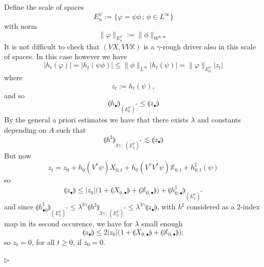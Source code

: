 \documentclass[11pt,a4paper]{amsart}
\numberwithin{equation}{section} %
\newenvironment{Dem}{%
    \begin{list}{\hspace{0.5cm}{\sc Proof --}}{%
        \setlength{\topsep}{0pt}%
        \setlength{\leftmargin}{0pt}%
        \setlength{\rightmargin}{0pt}%
        \setlength{\listparindent}{0pt}%
        \setlength{\itemindent}{0pt}%
        \setlength{\parsep}{0pt}%
        \addtolength{\leftmargin}{20pt}%
        \addtolength{\rightmargin}{0pt}%
    } \item }{\hfill{\space $\rhd$}\end{list}\smallskip}
\begin{document}
\begin{Dem}
Define the scale of spaces 
$$
E_n^\psi := \big\{\varphi = \psi \phi\,;\,\phi \in L^\infty\big\} 
$$
with norm 
$$
\|\varphi\|_{E_n^\psi} := \|\phi\|_{W^{n,\infty}}
$$ 
It is not difficult to check that $(V X, VV \mathbb{X})$ is a $\gamma$-rough driver also in this scale of spaces. In this case however we have
$$
\big|h_t(\varphi)\big| = \big|h_t ( \psi \phi)\big| \le \|\phi\|_{L^\infty} \big|h_t( \psi)\big| = \|\varphi\|_{E^\psi_0}\big|z_t\big|
$$
where 
$$
z_t := h_t(\psi), 
$$
and so
$$
\llparenthesis h_\bullet\rrparenthesis_{(E_0^\psi)^*}\le \llparenthesis z_\bullet \rrparenthesis
$$
By the general a priori estimates we have that there exists $\lambda$ and constants depending on $A$ such that
$$
\llparenthesis h^\sharp \rrparenthesis_{3\gamma\,;\,(E_3^\psi)^*} \lesssim \llparenthesis z_\bullet \rrparenthesis
$$
But now
$$
z_t = z_0 +  h_{0}(V^* \psi)X_{0,t}+  h_{0}(V^*V^* \psi)\mathbb{X}_{0,t} + h^\sharp_{0,t}(\psi)
$$
so
$$
\llparenthesis z_\bullet \rrparenthesis \le |z_0| \big(1+ \llparenthesis X_{0, \bullet} \rrparenthesis+ \llparenthesis \mathbb{X}_{0,\bullet} \rrparenthesis\big) + \llparenthesis h^\sharp_{0,\bullet} \rrparenthesis_{(E_3^\psi)^*}
$$
and since $  \llparenthesis h^\sharp_{\bullet 0} \rrparenthesis_{(E_3^\psi)^*} \le \lambda^{3\gamma} \llparenthesis h^\sharp \rrparenthesis_{3\gamma\,;\,(E_3^\psi)^*} \le \lambda^{3\gamma}  \llparenthesis z_\bullet \rrparenthesis$, with $h^\sharp$ considered as a 2-index map in its second occurence, we have for $\lambda$ small enough
\begin{equation}
\label{EqGronwall}
\llparenthesis z_\bullet \rrparenthesis \le 2 |z_0| \big(1+ \llparenthesis X_{0, \bullet} \rrparenthesis+ \llparenthesis \mathbb{X}_{0, \bullet} \rrparenthesis\big);
\end{equation}
so $z_t = 0$, for all $t\ge 0$, if $z_0 = 0$.

\bigskip
  

\end{Dem}
\end{document}
